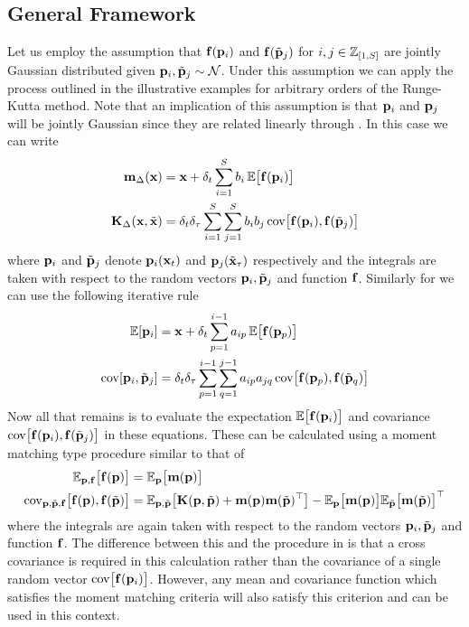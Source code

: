 \subsection{General Framework}
Let us employ the assumption that $\mathbf{f}(\mathbf{p}_i)$ and $\mathbf{f}(\tilde{\mathbf{p}}_j)$ for $i,j \in \mathbb{Z}_{[1,S]}$ are jointly Gaussian distributed given $\mathbf{p}_i,\tilde{\mathbf{p}}_j \sim \mathcal{N}$. Under this assumption we can apply the process outlined in the illustrative examples for arbitrary orders of the Runge-Kutta method. Note that an implication of this assumption is that $\mathbf{p}_i$ and $\mathbf{p}_j$ will be jointly Gaussian since they are related linearly through . In this case we can write
\begin{align}
\bmm_{\Delta}(\bx) &= \bx + \Dt \sum_{i=1}^{S} b_i \,\EE\big[\bff(\bp_i)\big]  \label{eqn:Mdelta} \\
%
\bK_{\Delta}(\bx,\tilde\bx) &= \Dt \delta_{\tau} \sum_{i=1}^{S} \sum_{j=1}^S b_ib_j \,
\cov\big[\bff(\bp_i), \bff(\tbp_j) \big] \label{eqn:Vdelta}
\end{align}
where $\mathbf{p}_i$ and $\tilde{\mathbf{p}}_j$ denote $\mathbf{p}_i(\mathbf{x}_t)$ and $\mathbf{p}_j(\tilde{\mathbf{x}}_\tau)$ respectively and the integrals are taken with respect to the random vectors $\mathbf{p}_i, \tilde{\mathbf{p}}_j$ and function $\mathbf{f}$. 
Similarly for  we can use the following iterative rule
\begin{align}
\mathbb{E}[\mathbf{p}_i] &= \mathbf{x} + \delta_t \sum_{p=1}^{i-1} a_{ip}\, \mathbb{E}\big[\mathbf{f}(\mathbf{p}_p)\big]
\label{eqn:piter1} \\
\mathrm{cov}[\mathbf{p}_i, \tilde{\mathbf{p}}_j] &= \delta_t \delta_{\tau} \sum_{p=1}^{i-1} \sum_{q=1}^{j-1} a_{ip} a_{jq}\, \mathrm{cov}\big[\mathbf{f}(\mathbf{p}_p), \mathbf{f}(\tilde{\mathbf{p}}_q)\big]
\label{eqn:piter2}
\end{align}
Now all that remains is to evaluate the expectation $\mathbb{E}\big[\mathbf{f}(\mathbf{p}_i)\big]$ and covariance $\mathrm{cov}\big[\mathbf{f}(\mathbf{p}_i), \mathbf{f}(\tilde{\mathbf{p}}_j) \big]$ in these equations. These can be calculated using a moment matching type procedure similar to that of 
\begin{align}
\mathbb{E}_{\mathbf{p},\mathbf{f}}\big[\mathbf{f}(\mathbf{p})\big] 
&= \mathbb{E}_{\mathbf{p}}\big[\mathbf{m}(\mathbf{p})\big] \label{eqn:Efc} \\
\mathrm{cov}_{\mathbf{p},\tilde{\mathbf{p}},\mathbf{f}}\big[\mathbf{f}(\mathbf{p}), \mathbf{f}(\tilde{\mathbf{p}})\big]
&= \mathbb{E}_{\mathbf{p},\tilde{\mathbf{p}}}\big[\mathbf{K}(\mathbf{p},\tilde{\mathbf{p}}) + \mathbf{m}(\mathbf{p})\mathbf{m}(\tilde{\mathbf{p}})^\top\big]
- \mathbb{E}_{\mathbf{p}}\big[\mathbf{m}(\mathbf{p})\big] \mathbb{E}_{\tilde{\mathbf{p}}}\big[\mathbf{m}(\tilde{\mathbf{p}})\big]^\top \label{eqn:Cfc}
\end{align}
where the integrals are again taken with respect to the random vectors $\mathbf{p}_i, \tilde{\mathbf{p}}_j$ and function $\mathbf{f}$. The difference between this and the procedure in  is that a cross covariance is required in this calculation rather than the covariance of a single random vector $\mathrm{cov}\big[\mathbf{f}(\mathbf{p}_i)\big]$. However, any mean and covariance function which satisfies the moment matching criteria will also satisfy this criterion and can be used in this context.


